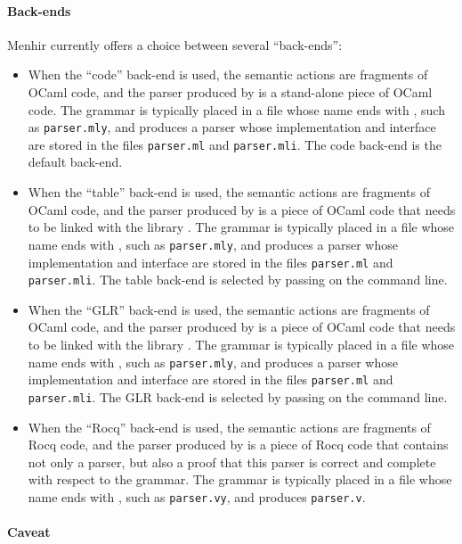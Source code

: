 \documentclass[onecolumn,11pt,nocopyrightspace,preprint]{sigplanconf}
\begin{document}
\paragraph*{Back-ends}
Menhir currently offers a choice between several ``back-ends'':
\begin{itemize}
\item When the ``code'' back-end is used,
      the semantic actions are fragments of OCaml code,
      and the parser produced by \menhir is a stand-alone piece of OCaml code.
      The grammar is typically placed in a file whose name ends with \mly,
      such as \texttt{parser.mly}, and \menhir produces
      a parser whose implementation and interface are stored in the files
      \texttt{parser.ml} and \texttt{parser.mli}.
      The code back-end is the default back-end.
\item When the ``table'' back-end is used,
      the semantic actions are fragments of OCaml code,
      and the parser produced by \menhir is a piece of OCaml code
      that needs to be linked with the library \menhirlib.
      The grammar is typically placed in a file whose name ends with \mly,
      such as \texttt{parser.mly}, and \menhir produces
      a parser whose implementation and interface are stored in the files
      \texttt{parser.ml} and \texttt{parser.mli}.
      The table back-end is selected by passing \otable on the command line.
\item When the ``GLR'' back-end is used,
      the semantic actions are fragments of OCaml code,
      and the parser produced by \menhir is a piece of OCaml code
      that needs to be linked with the library \menhirGLR.
      The grammar is typically placed in a file whose name ends with \mly,
      such as \texttt{parser.mly}, and \menhir produces
      a parser whose implementation and interface are stored in the files
      \texttt{parser.ml} and \texttt{parser.mli}.
      The GLR back-end is selected by passing \oGLR on the command line.
\item When the ``Rocq'' back-end is used,
      the semantic actions are fragments of Rocq code,
      and the parser produced by \menhir is a piece of Rocq code
      that contains not only a parser,
      but also a proof that this parser is correct and complete
      with respect to the grammar.
      The grammar is typically placed in a file whose name ends with \vy,
      such as \texttt{parser.vy}, and \menhir produces
      \texttt{parser.v}.
\end{itemize}

\paragraph*{Caveat}
\end{document}
